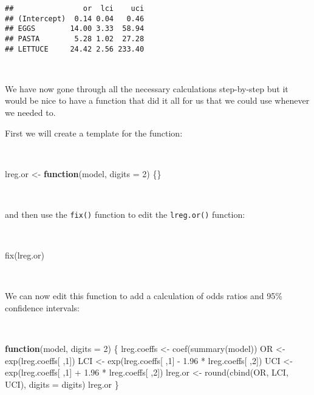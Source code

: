 \documentclass[
  12pt,
  a4paper]{book}
\newenvironment{Shaded}{\begin{snugshade}}{\end{snugshade}}
\newcommand{\AttributeTok}[1]{\textcolor[rgb]{0.77,0.63,0.00}{#1}}
\newcommand{\ControlFlowTok}[1]{\textcolor[rgb]{0.13,0.29,0.53}{\textbf{#1}}}
\newcommand{\DecValTok}[1]{\textcolor[rgb]{0.00,0.00,0.81}{#1}}
\newcommand{\FloatTok}[1]{\textcolor[rgb]{0.00,0.00,0.81}{#1}}
\newcommand{\FunctionTok}[1]{\textcolor[rgb]{0.00,0.00,0.00}{#1}}
\newcommand{\NormalTok}[1]{#1}
\newcommand{\OtherTok}[1]{\textcolor[rgb]{0.56,0.35,0.01}{#1}}
\newcommand{\SpecialCharTok}[1]{\textcolor[rgb]{0.00,0.00,0.00}{#1}}
\begin{document}
\begin{verbatim}
##                or  lci    uci
## (Intercept)  0.14 0.04   0.46
## EGGS        14.00 3.33  58.94
## PASTA        5.28 1.02  27.28
## LETTUCE     24.42 2.56 233.40
\end{verbatim}

~

We have now gone through all the necessary calculations step-by-step but it would be nice to have a function that did it all for us that we could use whenever we needed to.

First we will create a template for the function:

~

\begin{Shaded}
\begin{Highlighting}[]
\NormalTok{lreg.or }\OtherTok{\textless{}{-}} \ControlFlowTok{function}\NormalTok{(model, }\AttributeTok{digits =} \DecValTok{2}\NormalTok{) \{\}}
\end{Highlighting}
\end{Shaded}

~

and then use the \texttt{fix()} function to edit the \texttt{lreg.or()} function:

~

\begin{Shaded}
\begin{Highlighting}[]
\FunctionTok{fix}\NormalTok{(lreg.or)}
\end{Highlighting}
\end{Shaded}

~

We can now edit this function to add a calculation of odds ratios and 95\% confidence intervals:

~

\begin{Shaded}
\begin{Highlighting}[]
\ControlFlowTok{function}\NormalTok{(model, }\AttributeTok{digits =} \DecValTok{2}\NormalTok{) \{}
\NormalTok{  lreg.coeffs }\OtherTok{\textless{}{-}} \FunctionTok{coef}\NormalTok{(}\FunctionTok{summary}\NormalTok{(model))}
\NormalTok{  OR }\OtherTok{\textless{}{-}} \FunctionTok{exp}\NormalTok{(lreg.coeffs[ ,}\DecValTok{1}\NormalTok{])}
\NormalTok{  LCI }\OtherTok{\textless{}{-}} \FunctionTok{exp}\NormalTok{(lreg.coeffs[ ,}\DecValTok{1}\NormalTok{] }\SpecialCharTok{{-}} \FloatTok{1.96} \SpecialCharTok{*}\NormalTok{ lreg.coeffs[ ,}\DecValTok{2}\NormalTok{])}
\NormalTok{  UCI }\OtherTok{\textless{}{-}} \FunctionTok{exp}\NormalTok{(lreg.coeffs[ ,}\DecValTok{1}\NormalTok{] }\SpecialCharTok{+} \FloatTok{1.96} \SpecialCharTok{*}\NormalTok{ lreg.coeffs[ ,}\DecValTok{2}\NormalTok{])}
\NormalTok{  lreg.or }\OtherTok{\textless{}{-}} \FunctionTok{round}\NormalTok{(}\FunctionTok{cbind}\NormalTok{(OR, LCI, UCI), }\AttributeTok{digits =}\NormalTok{ digits)}
\NormalTok{  lreg.or}
\NormalTok{\}}
\end{Highlighting}
\end{Shaded}
\end{document}
